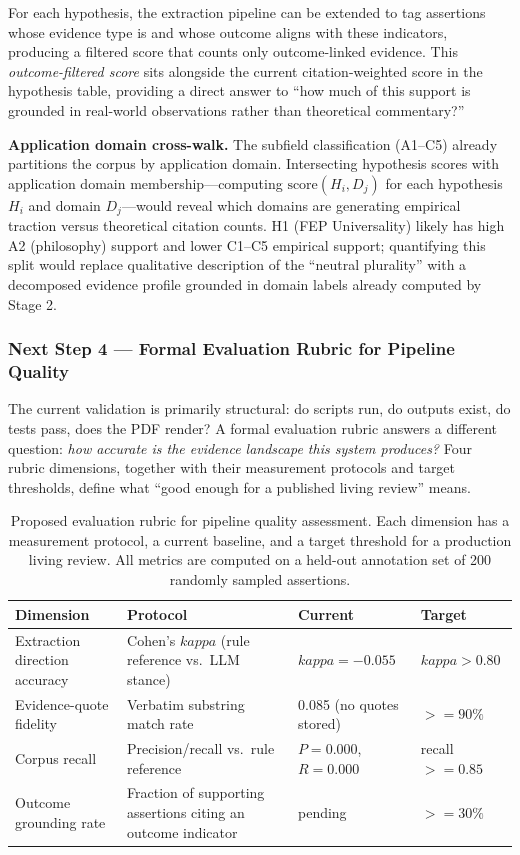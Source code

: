 \documentclass[
  english,
]{article}
\begin{document}
{{{{{{{{{{{{{{{{For each hypothesis, the extraction pipeline can be extended to tag
assertions whose evidence type is  and
whose outcome aligns with these indicators, producing a filtered score
that counts only outcome-linked evidence. This \emph{outcome-filtered
score} sits alongside the current citation-weighted score in the
hypothesis table, providing a direct answer to ``how much of this
support is grounded in real-world observations rather than theoretical
commentary?''

\textbf{Application domain cross-walk.} The subfield classification
(A1--C5) already partitions the corpus by application domain.
Intersecting hypothesis scores with application domain
membership---computing \(\text{score}(H_i, D_j)\) for each hypothesis
\(H_i\) and domain \(D_j\)---would reveal which domains are generating
empirical traction versus theoretical citation counts. H1 (FEP
Universality) likely has high A2 (philosophy) support and lower C1--C5
empirical support; quantifying this split would replace qualitative
description of the ``neutral plurality'' with a decomposed evidence
profile grounded in domain labels already computed by Stage 2.

\subsubsection{Next Step 4 --- Formal Evaluation Rubric for Pipeline
Quality}\label{next-step-4-formal-evaluation-rubric-for-pipeline-quality}

The current validation is primarily structural: do scripts run, do
outputs exist, do tests pass, does the PDF render? A formal evaluation
rubric answers a different question: \emph{how accurate is the evidence
landscape this system produces?} Four rubric dimensions, together with
their measurement protocols and target thresholds, define what ``good
enough for a published living review'' means.

\begin{table}[htbp]
\centering
\caption{Proposed evaluation rubric for pipeline quality assessment. Each dimension has a measurement protocol, a current baseline, and a target threshold for a production living review. All metrics are computed on a held-out annotation set of 200 randomly sampled assertions.}
\label{tab:eval_rubric}
\begin{tabular}{llll}
\toprule
\textbf{Dimension} & \textbf{Protocol} & \textbf{Current} & \textbf{Target} \\
\midrule
Extraction direction accuracy & Cohen's $kappa$ (rule reference vs.\ LLM stance) & $kappa = -0.055$ & $kappa > 0.80$ \\
Evidence-quote fidelity & Verbatim substring match rate & 0.085 (no quotes stored) & $>= 90\%$ \\
Corpus recall & Precision/recall vs.\ rule reference & $P = 0.000$, $R = 0.000$ & recall $>= 0.85$ \\
Outcome grounding rate & Fraction of supporting assertions citing an outcome indicator & pending & $>= 30\%$ \\
\bottomrule
\end{tabular}
\end{table}

}}}}}}}}}}}}}}}}
\end{document}
